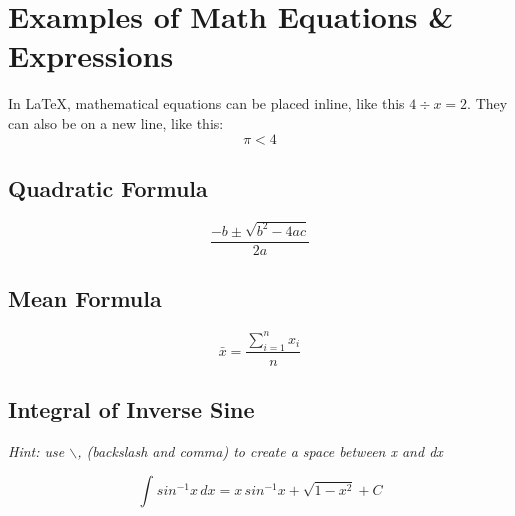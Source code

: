\section{Examples of Math Equations \& Expressions}

In LaTeX, mathematical equations can be placed inline, like this \(4 \div x = 2\). They can also be on a new line, like this: \[\pi <  4\]

\subsection{Quadratic Formula}

    \[\frac{-b \pm \sqrt{b^{2} - 4ac}}{2a}\]
    
\subsection{Mean Formula}
    \[\bar{x} = \frac{\sum_{i=1}^{n} x_i}{n}\]

\subsection{Integral of Inverse Sine}
\textit{Hint: use $\backslash$, (backslash and comma) to create a space between x and dx}

        \[\int_{}^{} sin^{-1}x\,dx = x\,sin^{-1}x + \sqrt{1 - x^{2}} + C\]
